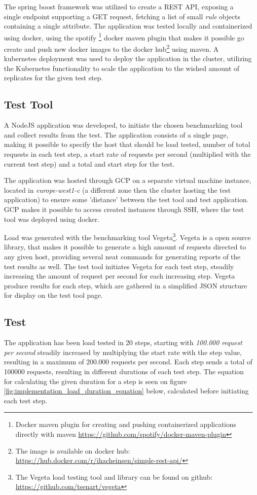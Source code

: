 The spring boost framework was utilized to create a REST API, exposing a single endpoint supporting a GET request, fetching a list of small \textit{rule} objects containing a single attribute. The application was tested locally and containerized using docker, using the spotify \footnote{Docker maven plugin for creating and pushing containerized applications directly with maven \url{https://github.com/spotify/docker-maven-plugin}} docker maven plugin that makes it possible go create and push new docker images to the docker hub\footnote{The image is available on docker hub: \url{https://hub.docker.com/r/ihacheinsen/simple-rest-api/}} using maven. A kubernetes deployment was  used to deploy the application in the cluster, utilizing the Kubernetes functionality to scale the application to the wished amount of replicates for the given test step.

\subsection{Test Tool}
A NodeJS application was developed, to initiate the chosen benchmarking tool and collect results from the test. The application consists of a single page, making it possible to specify the host that should be load tested, number of total requests in each test step, a start rate of requests per second (multiplied with the current test step) and a total and start step for the test. 

The application was hosted through GCP on a separate virtual machine instance, located in \textit{europe-west1-c} (a different zone then the cluster hosting the test application) to ensure some 'distance' between the test tool and test application. GCP makes it possible to access created instances through SSH, where the test tool was deployed using docker.

Load was generated with the benchmarking tool Vegeta\footnote{The Vegeta load testing tool and library can be found on github: \url{https://github.com/tsenart/vegeta}}. Vegeta is a open source library, that makes it possible to generate a high amount of requests directed to any given host, providing several neat commands for generating reports of the test results as well. The test tool initiates Vegeta for each test step, steadily increasing the amount of request per second for each increasing step. Vegeta produce results for each step, which are gathered in a simplified JSON structure for display on the test tool page.

\subsection{Test}
The application has been load tested in 20 steps, starting with \textit{100.000 request per second} steadily increased by multiplying the start rate with the step value, resulting in a maximum of 200.000 requests per second. Each step sends a total of 100000 requests, resulting in different durations of each test step. The equation for calculating the given duration for a step is seen on figure \ref{fig:implementation_load_duration_equation} below, calculated before initiating each test step.

